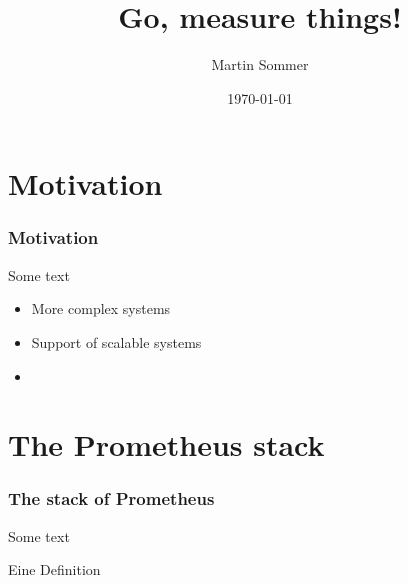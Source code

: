 \documentclass{beamer}
\title{Go, measure things!}
\author{Martin Sommer}
\date{\today}
\begin{document}
\maketitle

\frame{\tableofcontents[currentsection]}

\section{Motivation}
\begin{frame}
  \frametitle{Motivation} 
  Some text
  
  \begin{itemize}
   \item More complex systems \faLongArrowUp
   \item Support of scalable systems \faLongArrowUp
   \item 
  \end{itemize}

\end{frame}


\section{The Prometheus stack}
\begin{frame}
  \frametitle{The stack of Prometheus} 
  Some text
  
  \begin{Definition}
    Eine Definition
  \end{Definition}
\end{frame}
\end{document}
